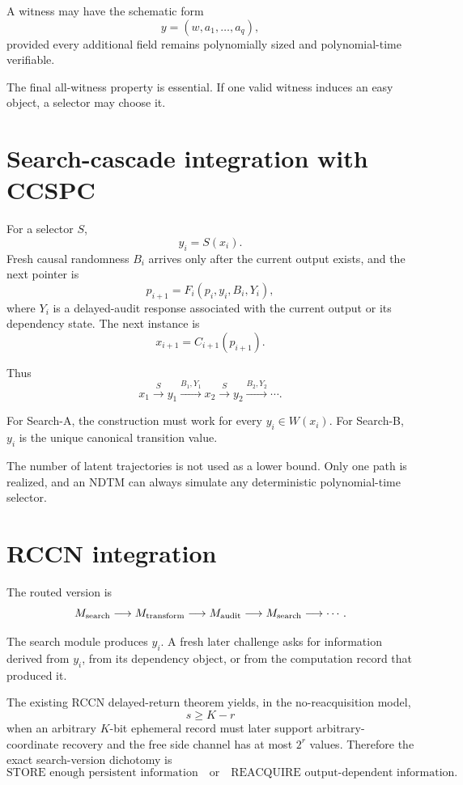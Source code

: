 \documentclass[11pt]{article}
\begin{document}
A witness may have the schematic form
\[
y=(w,a_1,\ldots,a_q),
\]
provided every additional field remains polynomially sized and polynomial-time verifiable.

The final all-witness property is essential. If one valid witness induces an easy object, a selector
may choose it.

\section{Search-cascade integration with CCSPC}

For a selector \(S\),
\[
y_i=S(x_i).
\]
Fresh causal randomness \(B_i\) arrives only after the current output exists, and the next pointer is
\[
p_{i+1}=F_i(p_i,y_i,B_i,Y_i),
\]
where \(Y_i\) is a delayed-audit response associated with the current output or its dependency state.
The next instance is
\[
x_{i+1}=C_{i+1}(p_{i+1}).
\]

Thus
\[
x_1
\xrightarrow{S}
y_1
\xrightarrow{B_1,Y_1}
x_2
\xrightarrow{S}
y_2
\xrightarrow{B_2,Y_2}
\cdots.
\]

For Search-A, the construction must work for every \(y_i\in W(x_i)\). For Search-B, \(y_i\) is
the unique canonical transition value.

The number of latent trajectories is not used as a lower bound. Only one path is realized, and an
NDTM can always simulate any deterministic polynomial-time selector.

\section{RCCN integration}

The routed version is
\[
M_{\rm search}
\longrightarrow
M_{\rm transform}
\longrightarrow
M_{\rm audit}
\longrightarrow
M_{\rm search}
\longrightarrow\cdots.
\]

The search module produces \(y_i\). A fresh later challenge asks for information derived from
\(y_i\), from its dependency object, or from the computation record that produced it.

The existing RCCN delayed-return theorem yields, in the no-reacquisition model,
\[
s\ge K-r
\]
when an arbitrary \(K\)-bit ephemeral record must later support arbitrary-coordinate recovery and
the free side channel has at most \(2^r\) values. Therefore the exact search-version dichotomy is
\[
\boxed{
\text{STORE enough persistent information}
\quad\text{or}\quad
\text{REACQUIRE output-dependent information}.
}
\]
\end{document}
